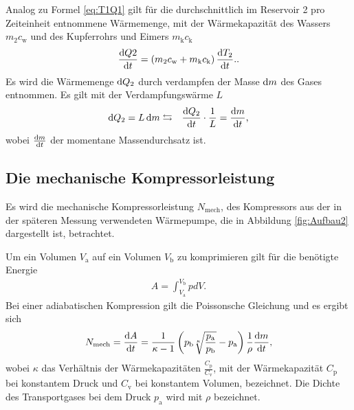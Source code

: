 Analog zu Formel \eqref{eq:T1Q1} gilt für die durchschnittlich im Reservoir 2 pro Zeiteinheit entnommene Wärmemenge, mit der Wärmekapazität des Wassers $m_2c_\text{w}$ und des Kupferrohrs und Eimers $m_\text{k}c_\text{k}$
\begin{equation}
\frac{\mathop{}\!\mathrm{d} Q2}{\mathop{}\!\mathrm{d} t} = \left( m_2c_\text{w} + m_\text{k}c_\text{k}\right) \frac{\mathop{}\!\mathrm{d} T_2}{\mathop{}\!\mathrm{d} t}\text{.}\label{eq:T2Q2}\text{.}
\end{equation}
Es wird die Wärmemenge $\mathop{}\!\mathrm{d} Q_2$ durch verdampfen der Masse $\mathop{}\!\mathrm{d} m$ des Gases entnommen.
Es gilt mit der Verdampfungswärme $L$
\begin{equation}
\begin{aligned}
\mathop{}\!\mathrm{d} Q_2 = L \mathop{}\!\mathrm{d} m & \leftrightarrows & \frac{\mathop{}\!\mathrm{d} Q_2}{\mathop{}\!\mathrm{d} t} \cdot \frac{1}{L} = \frac{\mathop{}\!\mathrm{d} m}{\mathop{}\!\mathrm{d} t}\text{,}\label{eq:diffmdifft}
\end{aligned}
\end{equation}
wobei $\frac{\mathop{}\!\mathrm{d} m}{\mathop{}\!\mathrm{d} t}$ der momentane Massendurchsatz ist.

\subsection{Die mechanische Kompressorleistung}
Es wird die mechanische Kompressorleistung $N_\text{mech}$, des Kompressors aus der in der späteren Messung verwendeten Wärmepumpe, die in Abbildung \ref{fig:Aufbau2} dargestellt ist, betrachtet.

Um ein Volumen $V_\text{a}$ auf ein Volumen $V_\text{b}$ zu komprimieren gilt für die benötigte Energie
\begin{eqnarray}
 A= \int_{V_\text{a}}^{V_\text{b}} p dV\text{.}
\end{eqnarray}
Bei einer adiabatischen Kompression gilt die Poissonsche Gleichung und es ergibt sich
\begin{equation}
N_\text{mech}=\frac{\mathop{}\!\mathrm{d} A}{\mathop{}\!\mathrm{d} t}= \frac{1}{\kappa -1}\left(p_\text{b} \sqrt[\kappa]{\frac{p_\text{a}}{p_\text{b}}} -p_\text{a}\right)\frac{1}{\rho} \frac{\mathop{}\!\mathrm{d} m}{\mathop{}\!\mathrm{d} t}\text{,}\label{eq:Nmech}
\end{equation}
wobei $\kappa$ das Verhältnis der Wärmekapazitäten $\frac{C_\text{p}}{C_\text{v}}$, mit der Wärmekapazität $C_\text{p}$ bei konstantem Druck und ${C_\text{v}}$ bei konstantem Volumen, bezeichnet.
Die Dichte des Transportgases bei dem Druck $p_\text{a}$ wird mit $\rho$ bezeichnet.